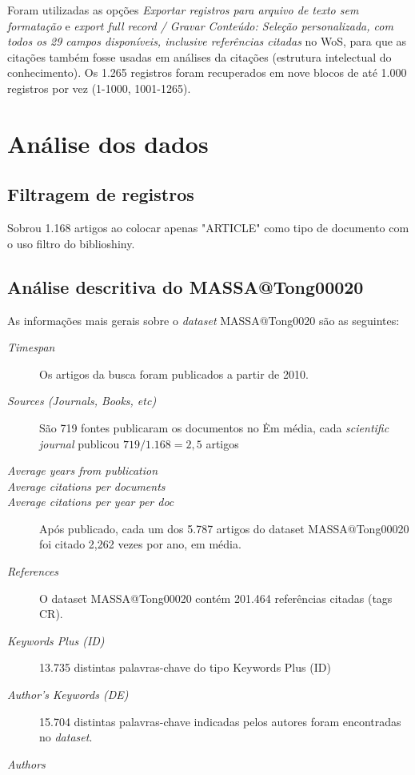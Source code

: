 Foram utilizadas as opções \textit{Exportar registros para arquivo de texto sem formatação} e \textit{export full record / Gravar Conteúdo: Seleção personalizada, com todos os 29 campos disponíveis, inclusive referências citadas} no WoS, para que as citações também fosse usadas em análises da citações (estrutura intelectual do conhecimento). Os 1.265 registros foram recuperados em nove blocos de até 1.000 registros por vez (1-1000, 1001-1265).

\section{Análise dos dados}



\subsection{Filtragem de registros}

Sobrou 1.168 artigos ao colocar apenas "ARTICLE" como tipo de documento com o uso filtro do biblioshiny.



\subsection{Análise descritiva do %
MASSA@Tong00020}

As informações mais gerais sobre o \textit{dataset} MASSA@Tong0020 são as seguintes:
\begin{description}
    \item[\textit{Timespan}] Os artigos da busca foram publicados a partir de 2010.
    \item [\textit{Sources (Journals, Books, etc)}] São 719 fontes publicaram os documentos no \dataset\. Em média, cada \textit{scientific journal} publicou $719/1.168=2,5$ artigos
     \item [\textit{Average years from publication}] 
     \item [\textit{Average citations per documents}]
     \item [\textit{Average citations per year per doc}] Após publicado, cada um dos 5.787 artigos do dataset MASSA@Tong00020  foi citado 2,262 vezes por ano, em média.
    \item [\textit{References}] O dataset MASSA@Tong00020 contém 201.464 referências citadas (tags CR).
    \item [\textit{Keywords Plus (ID)}] 13.735 distintas palavras-chave do tipo Keywords Plus (ID)
    \item [\textit{Author's Keywords (DE)}] 15.704 distintas palavras-chave indicadas pelos autores foram encontradas no \textit{dataset}.
    \item [\textit{Authors}]
    
\end{description}

